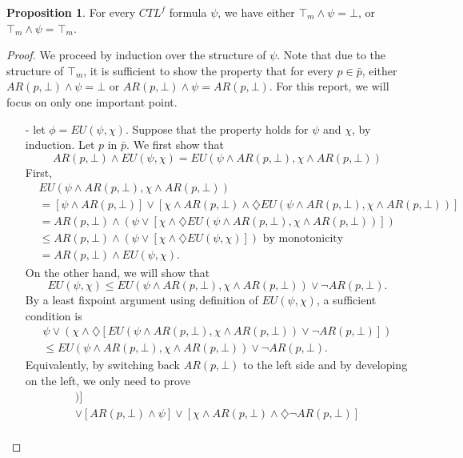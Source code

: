 \documentclass[11pt]{article}
\newcommand{\dia}{{\diamondsuit}}
\newcommand{\ARp}{{AR (p,\bot)}}
\theoremstyle{definition}
\newtheorem{proposition}[definition]{Proposition}
\begin{document}
\begin{proposition}\label{top_m}
    For every $CTL^f$ formula $\psi$, we have either $\top_m\wedge\psi=\bot$, or $\top_m\wedge\psi=\top_m$.
\end{proposition}
\begin{proof}
    We proceed by induction over the structure of $\psi$. Note that due to the structure of $\top_m$, 
    it is sufficient to show the property that for every $p\in\bar{p}$, either $\ARp\wedge\psi=\bot$ or $\ARp\wedge\psi=\ARp$.
    For this report, we will focus on only one important point.
    \begin{itemize}
        \setlength\itemsep{0em}
        \item[-] let $\phi = EU(\psi,\chi)$. Suppose that the property holds for $\psi$ and $\chi$, by induction. Let $p$ in $\bar{p}$. We first show that \[AR(p,\bot)\wedge EU(\psi,\chi)=EU(\psi\wedge AR(p,\bot),\chi\wedge AR(p,\bot))\]
            First, 
            \begin{align*}
                &EU(\psi\wedge AR(p,\bot),\chi\wedge AR(p,\bot))\\
                &=[\psi\wedge\ARp]\vee[\chi\wedge\ARp\wedge\dia EU(\psi\wedge AR(p,\bot),\chi\wedge AR(p,\bot))]\\
                &=\ARp\wedge(\psi\vee[\chi\wedge \dia EU(\psi\wedge AR(p,\bot),\chi\wedge AR(p,\bot))])\\
                &\leq\ARp\wedge(\psi\vee[\chi\wedge \dia EU(\psi,\chi)])\mbox{ by monotonicity}\\
                &=\ARp\wedge EU(\psi,\chi).
            \end{align*}
            On the other hand, we will show that \[EU(\psi,\chi)\leq EU(\psi\wedge\ARp,\chi\wedge\ARp)\vee\neg\ARp.\] 
            By a least fixpoint argument using definition of $EU(\psi,\chi)$, a sufficient condition is 
            \begin{multline*}
                \psi\vee(\chi\wedge\dia [EU(\psi\wedge\ARp,\chi\wedge\ARp)\vee\neg\ARp])\\
                \leq EU(\psi\wedge\ARp,\chi\wedge\ARp)\vee\neg\ARp.
            \end{multline*}
            Equivalently, by switching back $\ARp$ to the left side and by developing on the left, we only need to prove
            \begin{multline*}
                [\ARp\wedge(\psi\vee[\chi\wedge\dia EU(\psi\wedge\ARp,\chi\wedge\ARp)])]\\
                \vee[\ARp\wedge\psi]\vee[\chi\wedge\ARp\wedge\dia\neg\ARp]\\

\end{multline*}
\end{itemize}
\end{proof}
\end{document}
